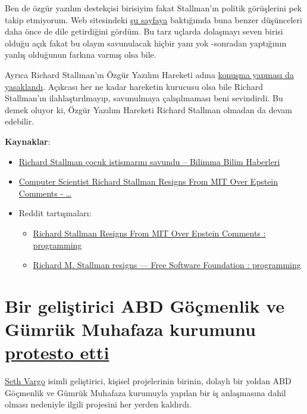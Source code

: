 \documentclass[11pt]{article}
\begin{document}
Ben de özgür yazılım destekçisi birisiyim fakat Stallman'ın politik görüşlerini
pek takip etmiyorum. Web sitesindeki \href{https://stallman.org/archives/2019-jul-oct.html}{şu sayfaya} baktığımda buna benzer
düşünceleri daha önce de dile getirdiğini gördüm. Bu tarz uçlarda dolaşmayı
seven birisi olduğu açık fakat bu olayın savunulacak hiçbir yanı yok -sonradan
yaptığının yanlış olduğunun farkına varmış olsa bile.

Ayrıca Richard Stallman'ın Özgür Yazılım Hareketi adına \href{https://sfconservancy.org/news/2019/sep/16/rms-does-not-speak-for-us/}{konuşma yapması da
yasaklandı}. Açıkcası her ne kadar hareketin kurucusu olsa bile Richard
Stallman'ın ilahlaştırılmayıp, savunulmaya çalışılmaması beni sevindirdi. Bu
demek oluyor ki, Özgür Yazılım Hareketi Richard Stallman olmadan da devam
edebilir.

\textbf{Kaynaklar}:
\begin{itemize}
\item \href{https://www.bilimma.com/richard-stallman-cocuk-istismarini-savundu/}{Richard Stallman çocuk istismarını savundu – Bilimma Bilim Haberleri}
\item \href{https://www.vice.com/en\_us/article/mbm74x/computer-scientist-richard-stallman-resigns-from-mit-over-epstein-comments}{Computer Scientist Richard Stallman Resigns From MIT Over Epstein Comments - \ldots{}}
\item Reddit tartışmaları:
\begin{itemize}
\item \href{https://www.reddit.com/r/programming/comments/d59r46/richard\_stallman\_resigns\_from\_mit\_over\_epstein/}{Richard Stallman Resigns From MIT Over Epstein Comments : programming}
\item \href{https://www.reddit.com/r/programming/comments/d5art6/richard\_m\_stallman\_resigns\_free\_software/}{Richard M. Stallman resigns — Free Software Foundation : programming}
\end{itemize}
\end{itemize}
\section{Bir geliştirici ABD Göçmenlik ve Gümrük Muhafaza kurumunu \href{https://www.zdnet.com/article/developer-takes-down-ruby-library-after-he-finds-out-ice-was-using-it/}{protesto etti}}
\label{sec:orgebe1633}
\href{https://github.com/sethvargo}{Seth Vargo} isimli geliştirici, kişisel projelerinin birinin, dolaylı bir yoldan
ABD Göçmenlik ve Gümrük Muhafaza kurumuyla yapılan bir iş anlaşmasına dahil
olması nedeniyle ilgili projesini her yerden kaldırdı.
\end{document}
